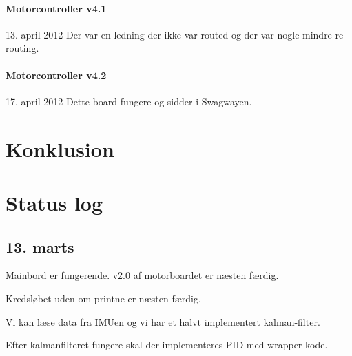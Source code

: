 \documentclass[a4paper,oneside,article,danish,table,draft]{memoir}
\newcommand{\boarddate}[1]{\textcolor{blue!80!black}{#1}}
\begin{document}
\subsubsection{Motorcontroller v4.1}
\boarddate{13. april 2012}
Der var en ledning der ikke var routed og der var nogle mindre re-routing.

\subsubsection{Motorcontroller v4.2}
\boarddate{17. april 2012}
Dette board fungere og sidder i Swagwayen.


\chapter{Konklusion} \label{chap:kon}
\clearpage
\listoftables
\listoffigures
 
\clearpage \appendix

\chapter{Status log}

\section{13. marts}
Mainbord er fungerende. v2.0 af motorboardet er næsten færdig.

Kredsløbet uden om printne er næsten færdig.

Vi kan læse data fra IMUen og vi har et halvt implementert kalman-filter.

Efter kalmanfilteret fungere skal der implementeres PID med wrapper kode.
\end{document}
